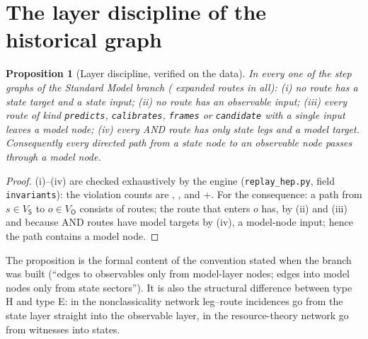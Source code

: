 \documentclass[11pt,a4paper,twoside,openany]{report}
\theoremstyle{plain}
\newtheorem{proposition}[theorem]{Proposition}
\theoremstyle{definition}
\theoremstyle{remark}
\newcommand{\lay}[1]{\mathsf{#1}}
\newcommand{\VS}{V_{\lay S}}\newcommand{\VM}{V_{\lay M}}\newcommand{\VO}{V_{\lay O}}
\newcommand{\id}[1]{\texttt{#1}}
\begin{document}
\section{The layer discipline of the historical graph}
\begin{proposition}[Layer discipline, verified on the data]\label{prop:discipline}
In every one of the \NhepStepsGraph{} step graphs of the Standard Model branch (\NhepRoutesChecked{} expanded routes in all): (i) no route has a state target and a state input; (ii) no route has an observable input; (iii) every route of kind \id{predicts}, \id{calibrates}, \id{frames} or \id{candidate} with a single input leaves a model node; (iv) every AND route has only state legs and a model target. Consequently every directed path from a state node to an observable node passes through a model node.
\end{proposition}
\begin{proof}
(i)--(iv) are checked exhaustively by the engine (\texttt{replay\_hep.py}, field \texttt{invariants}): the violation counts are \NhepInvStoSroutes{}, \NhepInvOasinput{}, \NhepInvmTwoofromnonM{} and \NhepInvandrouteswithnonSleg{}+\NhepInvandroutesintononM{}. For the consequence: a path from $s\in\VS$ to $o\in\VO$ consists of routes; the route that enters $o$ has, by (ii) and (iii) and because AND routes have model targets by (iv), a model-node input; hence the path contains a model node.
\end{proof}
The proposition is the formal content of the convention stated when the branch was built (``edges to observables only from model-layer nodes; edges into model nodes only from state sectors''). It is also the structural difference between type H and type E: in the nonclassicality network \NGPTPairStoO{} leg--route incidences go from the state layer straight into the observable layer, in the resource-theory network \NQRTPairOtoS{} go from witnesses into states.
\end{document}
